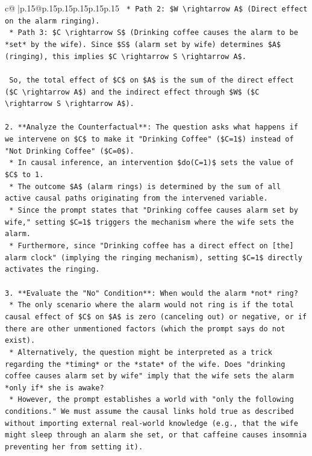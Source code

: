 \documentclass{article}
\begin{document}
{\begin{supertabular}{c@{$\;$}|p{.15\linewidth}@{}p{.15\linewidth}p{.15\linewidth}p{.15\linewidth}p{.15\linewidth}p{.15\linewidth}}
{{{\texttt{    *   Path 2: \$W \textbackslash{}rightarrow A\$ (Direct effect on the alarm ringing).} \\
\texttt{    *   Path 3: \$C \textbackslash{}rightarrow S\$ (Drinking coffee causes the alarm to be *set* by the wife). Since \$S\$ (alarm set by wife) determines \$A\$ (ringing), this implies \$C \textbackslash{}rightarrow S \textbackslash{}rightarrow A\$.} \\
\\ 
\texttt{    So, the total effect of \$C\$ on \$A\$ is the sum of the direct effect (\$C \textbackslash{}rightarrow A\$) and the indirect effect through \$W\$ (\$C \textbackslash{}rightarrow S \textbackslash{}rightarrow A\$).} \\
\\ 
\texttt{2.  **Analyze the Counterfactual**: The question asks what happens if we intervene on \$C\$ to make it "Drinking Coffee" (\$C=1\$) instead of "Not Drinking Coffee" (\$C=0\$).} \\
\texttt{    *   In causal inference, an intervention \$do(C=1)\$ sets the value of \$C\$ to 1.} \\
\texttt{    *   The outcome \$A\$ (alarm rings) is determined by the sum of all active causal paths originating from the intervened variable.} \\
\texttt{    *   Since the prompt states that "Drinking coffee causes alarm set by wife," setting \$C=1\$ triggers the mechanism where the wife sets the alarm.} \\
\texttt{    *   Furthermore, since "Drinking coffee has a direct effect on {[}the{]} alarm clock" (implying the ringing mechanism), setting \$C=1\$ directly activates the ringing.} \\
\\ 
\texttt{3.  **Evaluate the "No" Condition**: When would the alarm *not* ring?} \\
\texttt{    *   The only scenario where the alarm would not ring is if the total causal effect of \$C\$ on \$A\$ is zero (canceling out) or negative, or if there are other unmentioned factors (which the prompt says do not exist).} \\
\texttt{    *   Alternatively, the question might be interpreted as a trick regarding the *timing* or the *state* of the wife. Does "drinking coffee causes alarm set by wife" imply that the wife sets the alarm *only if* she is awake?} \\
\texttt{    *   However, the prompt establishes a world with "only the following conditions." We must assume the causal links hold true as described without importing external real{-}world knowledge (e.g., that the wife might sleep through an alarm she set, or that caffeine causes insomnia preventing her from setting it).} \\
}}}
\end{supertabular}}
\end{document}
